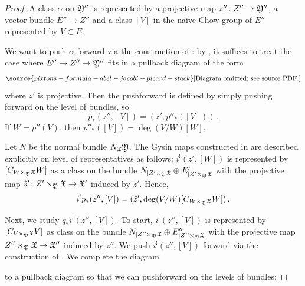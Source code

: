 \begin{proof}
 A class $\alpha$ on $\frak Y''$ is represented by a projective map $z''\colon Z'' \to \frak Y''$, a vector bundle $E'' \to Z''$ and a class $[V]$
 in the naive Chow group of $E''$ represented  by $V \subset E$.

We want to push $\alpha$ forward via the construction of \cite[Appendix B]{BaeSchmitt1}: by \cite[Theorem B.17]{BaeSchmitt1}, it suffices to treat the case where $E'' \to Z'' \to \frak Y''$ fits in a pullback diagram of the form
\begin{equation}\label{diagramskowerapushf}
\source{pixtons-formula-abel-jacobi-picard-stack}
\text{[Diagram omitted; see source PDF.]}
\end{equation}
where $z'$ is projective. %
Then the pushforward is defined by simply pushing forward on the level of bundles, so
$$p_*(z'',[V]) = (z',p''_*([V]))\, .$$
If $W = p''(V)$, then $p''_*([V]) = \deg(V/W)[W]$.

Let $N$ be the normal bundle $N_{\frak X} \frak Y$.
The Gysin maps constructed in \cite[Section 3.1]{Kresch1999Cycle-groups-fo} are described explicitly on level of representatives as follows: $i^!(z',[W])$ is represented by $[C_{W\times_{\frak Y} \frak X} W]$ as a class on the bundle $N_{\mid Z' \times_{\frak Y} \frak X} \oplus E'_{\mid Z' \times_{\frak Y} \frak X}$ with the projective map $\tilde{z}'\colon Z' \times_{\frak Y} \frak X \to \frak X'$ induced by $z'$. Hence, $$i^!p_*(z'',[V]) =(\tilde{z}', \deg(V/W) [C_{W\times_{\frak Y} \frak X} W])\, .$$


Next, we study $q_*i^!(z'',[V])$.
To start, $i^!(z'',[V])$ is represented by $[C_{V\times_{\frak Y} \frak X} V]$ as class on the bundle $N_{\mid Z'' \times_{\frak Y} \frak X} \oplus E''_{\mid Z'' \times_{\frak Y} \frak X}$   with the projective map $Z'' \times_{\frak Y} \frak X \to \frak X''$ induced by $z''$.
We push $i^!(z'',[V])$
forward via the construction of \cite[Appendix B]{BaeSchmitt1}. We complete the diagram


to a pullback diagram so that we can pushforward on the levels of bundles: %


\end{proof}

